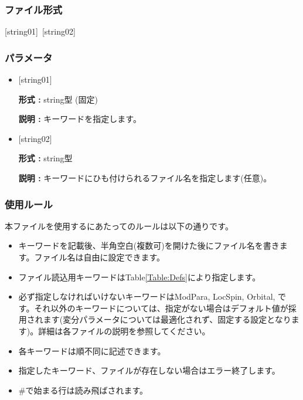 \subsubsection{ファイル形式}
[string01]~[string02]
\subsubsection{パラメータ}
 \begin{itemize}
   \item  $[$string01$]$
   
   {\bf 形式 :} string型 (固定)
   
   {\bf 説明 :} キーワードを指定します。
   
   \item  $[$string02$]$
   
    {\bf 形式 :} string型 

   {\bf 説明 :} キーワードにひも付けられるファイル名を指定します(任意)。
 \end{itemize}
\subsubsection{使用ルール}
本ファイルを使用するにあたってのルールは以下の通りです。
\begin{itemize}
\item キーワードを記載後、半角空白(複数可)を開けた後にファイル名を書きます。ファイル名は自由に設定できます。
\item ファイル読込用キーワードはTable\ref{Table:Defs}により指定します。
\item 必ず指定しなければいけないキーワードはModPara, LocSpin, Orbital, です。それ以外のキーワードについては、指定がない場合はデフォルト値が採用されます(変分パラメータについては最適化されず、固定する設定となります)。詳細は各ファイルの説明を参照してください。
\item 各キーワードは順不同に記述できます。
\item 指定したキーワード、ファイルが存在しない場合はエラー終了します。
\item $\#$で始まる行は読み飛ばされます。
\end{itemize}

